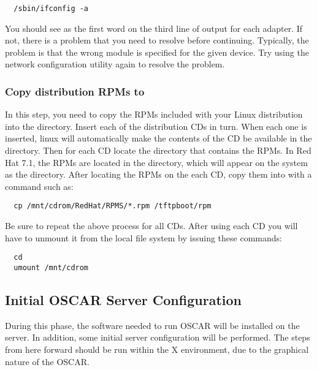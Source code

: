 \begin{verbatim}
  /sbin/ifconfig -a
\end{verbatim}
  
You should see  as the first word on the third line of output
for each adapter. If not, there is a problem that you need to resolve
before continuing. Typically, the problem is that the wrong module is
specified for the given device. Try using the network configuration
utility again to resolve the problem.
  
\subsubsection{Copy distribution RPMs to }
\label{det:rpmcopy}

In this step, you need to copy the RPMs included with your Linux
distribution into the  directory.  Insert each of
the distribution CDs in turn.  When each one is inserted, linux will
automatically make the contents of the CD be available in the
 directory.  Then for each CD locate the directory
that contains the RPMs.  In Red Hat 7.1, the RPMs are located in the
 directory, which will appear on the system as the
 directory.  After locating the RPMs on
the each CD, copy them into  with a command such
as:

\begin{verbatim}
  cp /mnt/cdrom/RedHat/RPMS/*.rpm /tftpboot/rpm
\end{verbatim}
  
Be sure to repeat the above process for all CDs. 
After using each CD you will have to unmount it from the local
file system by issuing these commands:

\begin{verbatim}
  cd
  umount /mnt/cdrom
\end{verbatim}

  
\subsection{Initial OSCAR Server Configuration}

During this phase, the software needed to run OSCAR will be installed
on the server. In addition, some initial server configuration will be
performed. The steps from here forward should be run within the X
environment, due to the graphical nature of the OSCAR.

